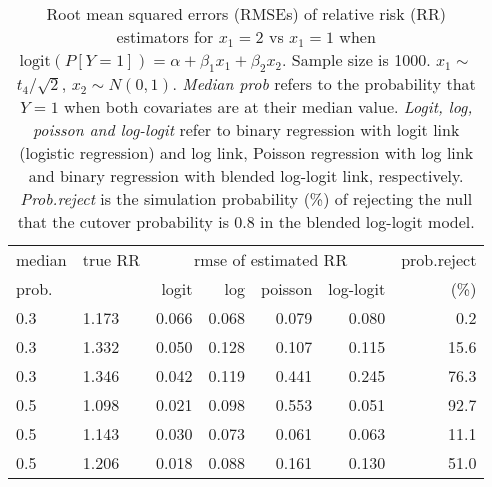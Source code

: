 \documentclass[12pt,a4paper]{article}
\begin{document}
\begin{table}[H] 
\small\sf\centering 
\caption{Root mean squared errors (RMSEs) of relative risk (RR) estimators for $x_1=2$ vs $x_1=1$ when $\mbox{logit}(P[Y=1])=\alpha+\beta_1 x_1 + \beta_2 x_2$. Sample size is 1000. $x_1 \sim $$t_4/\sqrt{2}$, $x_2 \sim N(0,1)$. {\it Median prob} refers to the probability that $Y=1$ when both covariates are at their median value. {\it Logit, log, poisson and log-logit} refer to binary regression with logit link (logistic regression) and log link, Poisson regression with log link and binary regression with blended log-logit link, respectively. {\it Prob.reject} is the simulation probability (\%) of rejecting the null that the cutover probability is $0.8$ in the blended log-logit model.} 
\begin{tabular}{llrrrrr} 
\toprule 
median & true RR & \multicolumn{4}{c}{rmse of estimated RR} & prob.reject \\ 
prob. & & logit & log & poisson & log-logit  & (\%) \\ \midrule 
0.3 & 1.173 & 0.066 & 0.068 & 0.079 & 0.080 &  0.2 \\  
0.3 & 1.332 & 0.050 & 0.128 & 0.107 & 0.115 & 15.6 \\  
0.3 & 1.346 & 0.042 & 0.119 & 0.441 & 0.245 & 76.3 \\  
0.5 & 1.098 & 0.021 & 0.098 & 0.553 & 0.051 & 92.7 \\  
0.5 & 1.143 & 0.030 & 0.073 & 0.061 & 0.063 & 11.1 \\  
0.5 & 1.206 & 0.018 & 0.088 & 0.161 & 0.130 & 51.0 \\  
\bottomrule 
\end{tabular} 
\end{table} 
\end{document}
